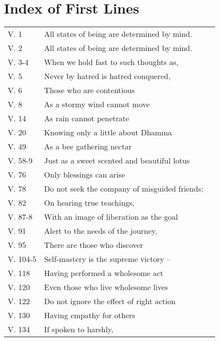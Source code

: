 
\chapter{Index of First Lines}

{\smaller
\setlength{\parskip}{0pt}
\setlength{\parindent}{0pt}

\begin{longtable}[c]{llr}
V. 1 & All states of being are determined by mind. & \pageref{dhp-1}\\
V. 2 & All states of being are determined by mind. & \pageref{dhp-2}\\
V. 3-4 & When we hold fast to such thoughts as, & \pageref{dhp-3}\\
V. 5 & Never by hatred is hatred conquered, & \pageref{dhp-5}\\
V. 6 & Those who are contentious & \pageref{dhp-6}\\
V. 8 & As a stormy wind cannot move & \pageref{dhp-8}\\
V. 14 & As rain cannot penetrate & \pageref{dhp-14}\\
V. 20 & Knowing only a little about Dhamma & \pageref{dhp-20}\\
V. 49 & As a bee gathering nectar & \pageref{dhp-49}\\
V. 58-9 & Just as a sweet scented and beautiful lotus & \pageref{dhp-58}\\
V. 76 & Only blessings can arise & \pageref{dhp-76}\\
V. 78 & Do not seek the company of misguided friends; & \pageref{dhp-78}\\
V. 82 & On hearing true teachings, & \pageref{dhp-82}\\
V. 87-8 & With an image of liberation as the goal & \pageref{dhp-87}\\
V. 91 & Alert to the needs of the journey, & \pageref{dhp-91}\\
V. 95 & There are those who discover & \pageref{dhp-95}\\
V. 104-5 & Self-mastery is the supreme victory -- & \pageref{dhp-104}\\
V. 118 & Having performed a wholesome act & \pageref{dhp-118}\\
V. 120 & Even those who live wholesome lives & \pageref{dhp-120}\\
V. 122 & Do not ignore the effect of right action & \pageref{dhp-122}\\
V. 130 & Having empathy for others & \pageref{dhp-130}\\
V. 134 & If spoken to harshly, & \pageref{dhp-134}\\

\end{longtable}}
